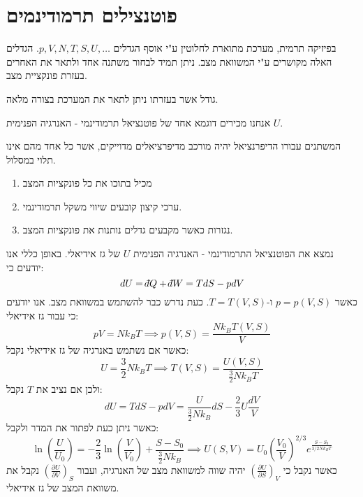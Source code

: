 \documentclass{tstextbook}
\begin{document}
\section{פוטנצילים תרמודינמים}

בפיזיקה תרמית, מערכת מתוארת לחלוטין ע"י אוסף הגדלים \(p,V,N,T,S,U, \dots\). הגדלים האלה מקושרים ע"י המשוואת מצב. ניתן תמיד לבחור משתנה אחד ולתאר את האחרים בעזרת פונקציית מצב.

\begin{definition}
גודל אשר בעזרתו ניתן לתאר את המערכת בצורה מלאה.

\end{definition}
אנחנו מכירים דוגמא אחד של פוטנציאל תרמודינמי - האנרגיה הפנימית \(U\).

\begin{definition}
המשתנים עבורו הדיפרנציאל יהיה מורכב מדיפרציאלים מדוייקים, אשר כל אחד מהם אינו תלוי במסלול.

\end{definition}
\begin{proposition}
  \begin{enumerate}
    \item מכיל בתוכו את כל פונקציות המצב 


    \item ערכי קיצון קובעים שיווי משקל תרמודינמי. 


    \item נגזרות כאשר מקבעים גדלים נותנות את פונקציות המצב. 


  \end{enumerate}
\end{proposition}
\begin{example}
נמצא את הפוטנציאל התרמודינמי - האנרגיה הפנימית \(U\) של גז אידיאלי. באופן כללי אנו יודעים כי:
$$dU=\;\bar{}\mkern-7.5mu dQ+\;\bar{}\mkern-7.5mu dW =TdS - pdV$$
כאשר \(p=p(V,S)\) ו-\(T=T(V,S)\). כעת נדרש כבר להשתמש במשוואת מצב. אנו יודעים כי עבור גז אידיאלי:
$$pV=Nk_{B}T \implies p(V,S)= \frac{Nk_{B}T(V,S)}{V}$$
כאשר אם נשתמש באנרגיה של גז אידיאלי נקבל:
$$U=\frac{3}{2}Nk_{B}T\implies T(V,S)= \frac{U(V,S)}{\frac{3}{2}Nk_{B}T}$$
ולכן אם נציב את \(T\) נקבל:
$$dU= TdS-pdV=\frac{U}{\frac{3}{2}Nk_{B}}dS - \frac{2}{3}U \frac{dV}{V}$$
כאשר ניתן כעת לפתור את המדר ולקבל:
$$\ln \left( \frac{U}{U_{0}} \right)=-\frac{2}{3}\ln\left( \frac{V}{V_{0}} \right)+\frac{S-S_{0}}{\frac{3}{2}Nk_{B}} \implies U(S,V)=U_{0}\left( \frac{V_{0}}{V} \right)^{2/3} e^{ \frac{S-S_{0}}{3/2 Nk_{B}T} }$$
כאשר נקבל כי \(\left( \frac{\partial U}{\partial S} \right)_{V}\) יהיה שווה למשוואת מצב של האנרגיה, ועבור \(\left( \frac{\partial U}{\partial V} \right)_{S}\) נקבל את משוואת המצב של גז אידיאלי.

\end{example}
\end{document}
